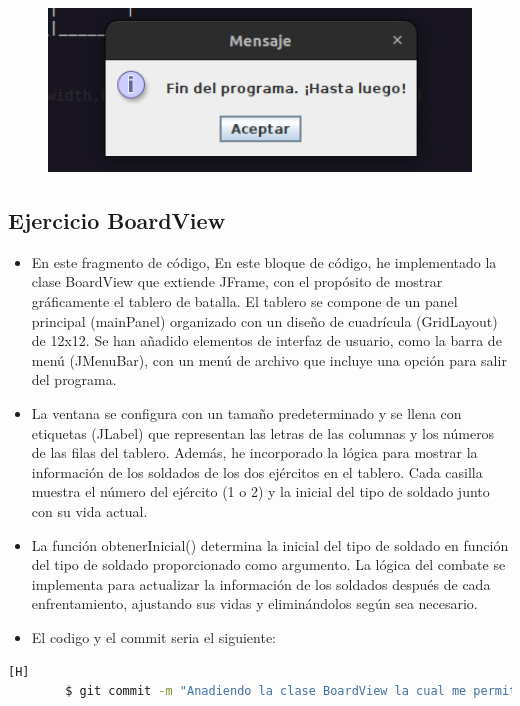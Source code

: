 \documentclass{article}
\begin{document}
	\begin{figure}[H]
		\centering
		\includegraphics[width=1.0\textwidth,keepaspectratio]{img/Commit12-4.png}
	\end{figure}
	\subsection{Ejercicio BoardView}
	\begin{itemize}	
		\item En este fragmento de código, En este bloque de código, he implementado la clase BoardView que extiende JFrame, con el propósito de mostrar gráficamente el tablero de batalla. El tablero se compone de un panel principal (mainPanel) organizado con un diseño de cuadrícula (GridLayout) de 12x12. Se han añadido elementos de interfaz de usuario, como la barra de menú (JMenuBar), con un menú de archivo que incluye una opción para salir del programa.
		\item La ventana se configura con un tamaño predeterminado y se llena con etiquetas (JLabel) que representan las letras de las columnas y los números de las filas del tablero. Además, he incorporado la lógica para mostrar la información de los soldados de los dos ejércitos en el tablero. Cada casilla muestra el número del ejército (1 o 2) y la inicial del tipo de soldado junto con su vida actual.
		\item La función obtenerInicial() determina la inicial del tipo de soldado en función del tipo de soldado proporcionado como argumento. La lógica del combate se implementa para actualizar la información de los soldados después de cada enfrentamiento, ajustando sus vidas y eliminándolos según sea necesario.
		\item El codigo y el commit seria el siguiente:
	\end{itemize}	
	\begin{lstlisting}[language=bash,caption={Commit}][H]
		$ git commit -m "Anadiendo la clase BoardView la cual me permite ver la tabla de forma grafica nos ayudamos de las java awt y java swing para lograr esto"
	\end{lstlisting}	
\end{document}
